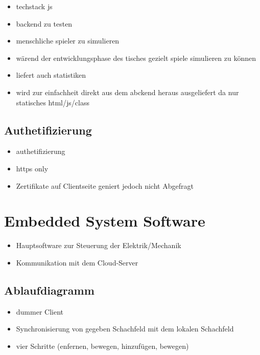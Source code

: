 \begin{itemize}
\tightlist
\item
  techstack js
\item
  backend zu testen
\item
  menschliche spieler zu simulieren
\item
  wärend der entwicklungsphase des tisches gezielt spiele simulieren zu
  können
\item
  liefert auch statistiken
\item
  wird zur einfachheit direkt aus dem abckend heraus ausgeliefert da nur
  statisches html/js/class
\end{itemize}

\hypertarget{authetifizierung}{%
\subsection{Authetifizierung}\label{authetifizierung}}

\begin{itemize}
\tightlist
\item
  authetifizierung
\item
  https only
\item
  Zertifikate auf Clientseite geniert jedoch nicht Abgefragt
\end{itemize}

\hypertarget{embedded-system-software}{%
\section{Embedded System Software}\label{embedded-system-software}}

\begin{itemize}
\tightlist
\item
  Hauptsoftware zur Steuerung der Elektrik/Mechanik
\item
  Kommunikation mit dem Cloud-Server
\end{itemize}

\hypertarget{ablaufdiagramm}{%
\subsection{Ablaufdiagramm}\label{ablaufdiagramm}}

\begin{itemize}
\item
  dummer Client
\item
  Synchronisierung von gegeben Schachfeld mit dem lokalen Schachfeld
\item
  vier Schritte (enfernen, bewegen, hinzufügen, bewegen)
\end{itemize}

